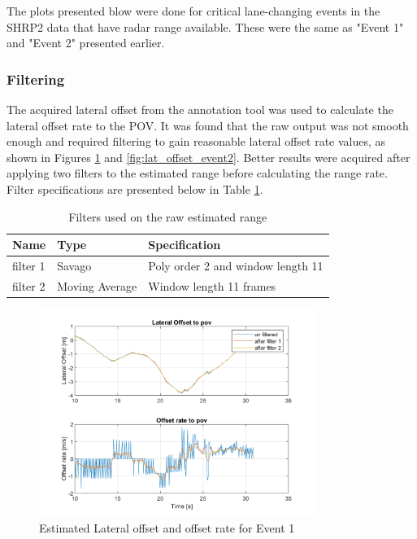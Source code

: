 The plots presented blow were done for critical lane-changing events in the SHRP2 data that have radar range available. These were the same as "Event 1" and "Event 2" presented earlier.  

\subsubsection{Filtering}

The acquired lateral offset from the annotation tool was used to calculate the lateral offset rate to the POV. It was found that the raw output was not smooth enough and required filtering to gain reasonable lateral offset rate values, as shown in Figures \ref{fig:lat_offset_event1} and \ref{fig:lat_offset_event2}. Better results were acquired after applying two filters to the estimated range before calculating the range rate. Filter specifications are presented below in Table \ref{tab:filters}.

\begin{table}[H]
    \centering
\begin{tabular}{l|l|l}
    \textbf{Name} & \textbf{Type} & \textbf{Specification} \\
    \hline
    filter 1&  Savago & Poly order 2 and window length 11\\
    filter 2& Moving Average & Window length 11 frames
\end{tabular}
    \caption{Filters used on the raw estimated range}
    \label{tab:filters}
\end{table}


\begin{figure}[H]
    \centering
    \includegraphics[width=0.8\textwidth]{FiguresMat/filter_compare_lateral_10794257.png}
    \caption{Estimated Lateral offset and offset rate for Event 1}
    \label{fig:lat_offset_event1}
\end{figure}

